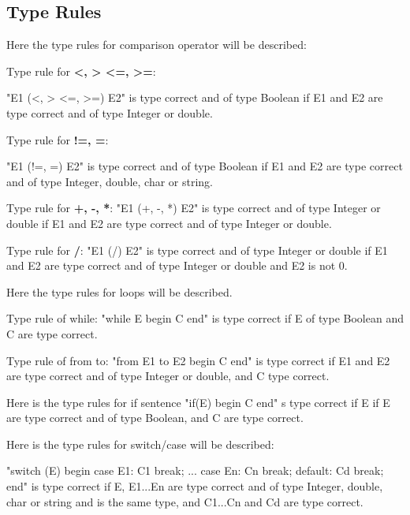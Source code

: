 \subsection{Type Rules}
Here the type rules for comparison operator will be described:

Type rule for \textbf{<, > <=, >=}:

"E1 (<, > <=, >=) E2" is type correct and of type Boolean if E1 and E2 are type correct and of type Integer or double.

Type rule for \textbf{!=, =}:

"E1 (!=, =) E2" is type correct and of type Boolean if E1 and E2 are type correct and of type Integer, double, char or string.

Type rule for \textbf{+, -, *}:
"E1 (+, -, *) E2" is type correct and of type Integer or double if E1 and E2 are type correct and of type Integer or double.

Type rule for \textbf{/}:
"E1 (/) E2" is type correct and of type Integer or double if E1 and E2 are type correct and of type Integer or double and E2 is not 0.

Here the type rules for loops will be described.

Type rule of while: 
"while E begin C end" is type correct if E of type Boolean and C are type correct.

Type rule of from to: 
"from E1 to E2 begin C end" is type correct if E1 and E2 are type correct and of type Integer or double, and C type correct.

Here is the type rules for if sentence
"if(E) begin C end" s type correct if E if E are type correct and of type Boolean, and C are type correct.

Here is the type rules for switch/case will be described:

"switch (E) begin case E1: C1 break; ... case En: Cn break; default: Cd break; end" is type correct if E, E1...En are type correct and of type Integer, double, char or string and is the same type, and C1...Cn and Cd are type correct.